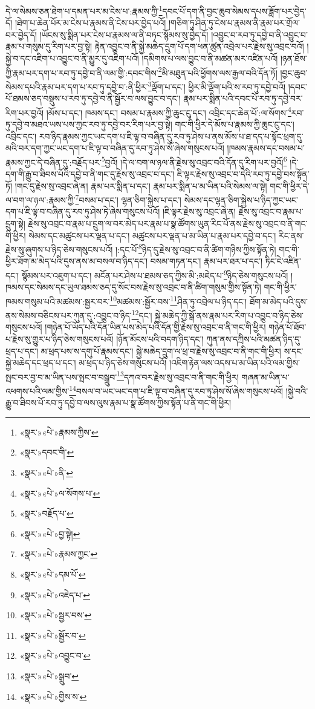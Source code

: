 དེ་ལ་སེམས་ཅན་ཐེག་པ་དམན་པར་མ་ངེས་པ་:རྣམས་ཀྱི་\footnote{«སྣར་»«པེ་»རྣམས་ཀྱིས་}དབང་པོ་དག་ནི་བྱང་ཆུབ་སེམས་དཔས་ཟློག་པར་བྱེད་དོ། །ཐེག་པ་ཆེན་པོར་མ་ངེས་པ་རྣམས་ནི་ངེས་པར་བྱེད་པའོ། །གཅིག་ཏུ་ཤིན་ཏུ་ངེས་པ་རྣམས་ནི་རྣམ་པར་གྲོལ་བར་བྱེད་དོ། །ཡོངས་སུ་སྨིན་པར་ངེས་པ་རྣམས་ལ་ནི་བཏང་སྙོམས་སུ་བྱེད་དོ། །འབྱུང་བ་རབ་ཏུ་དབྱེ་བ་ནི་འབྱུང་བ་རྣམ་པ་གསུམ་དུ་རིག་པར་བྱ་སྟེ། རྟེན་འབྱུང་བ་ནི་སྐྱེ་མཆེད་དྲུག་པོ་དག་ཕན་ཚུན་འབྲེལ་པར་རྗེས་སུ་འབྲང་བའོ། །སྐྱེ་བ་དང་འཇིག་པ་འབྱུང་བ་ནི་མྱུར་དུ་འཇིག་པའོ། །དམིགས་པ་ལས་བྱུང་བ་ནི་མཚན་མར་འཛིན་པའོ། །ཉན་ཐོས་ཀྱི་རྣམ་པར་དག་པ་རབ་ཏུ་དབྱེ་བ་ནི་ལམ་གྱི་:དབང་གིས་\footnote{«སྣར་»དབང་གི་}མི་མཐུན་པའི་ཕྱོགས་ལས་རྒྱལ་བའི་དོན་ཏོ། །བྱང་ཆུབ་སེམས་དཔའི་རྣམ་པར་དག་པ་རབ་ཏུ་དབྱེ་བ་:ནི་ཕྱིར་\footnote{«སྣར་»«པེ་»ནི་}ལྡོག་པ་དང་། ཕྱིར་མི་ལྡོག་པའི་ས་རབ་ཏུ་དབྱེ་བའོ། །དབང་པོ་ཐམས་ཅད་བསྡུས་པ་རབ་ཏུ་དབྱེ་བ་ནི་སྦྱོར་བ་ལས་བྱུང་བ་དང་། རྣམ་པར་སྨིན་པའི་དབང་པོ་རབ་ཏུ་དབྱེ་བར་རིག་པར་བྱའོ། །མོས་པ་དང་། ཁམས་དང་། བསམ་པ་རྣམས་ཀྱི་ཆུང་ངུ་དང་། འབྲིང་དང་ཆེན་པོ་:ལ་སོགས་\footnote{«སྣར་»«པེ་»ལ་སོགས་པ་}རབ་ཏུ་དབྱེ་བ་མཐའ་ཡས་པས་ཀྱང་རབ་ཏུ་དབྱེ་བར་རིག་པར་བྱ་སྟེ། གང་གི་ཕྱིར་དེ་མོས་པ་རྣམས་ཀྱི་ཆུང་ངུ་དང་། འབྲིང་དང་། རབ་ཉིད་རྣམས་ཀྱང་ཡང་དག་པ་ཇི་ལྟ་བ་བཞིན་དུ་རབ་ཏུ་ཤེས་པ་ནས་མོས་པ་ཐ་དད་པ་སྟོང་ཕྲག་དུ་མའི་བར་དག་ཀྱང་ཡང་དག་པ་ཇི་ལྟ་བ་བཞིན་དུ་རབ་ཏུ་ཤེས་སོ་ཞེས་གསུངས་པའོ། །ཁམས་རྣམས་དང་བསམ་པ་རྣམས་ཀྱང་དེ་བཞིན་དུ་:བརྗོད་པར་\footnote{«སྣར་»བརྗོད་པ་}བྱའོ། །དེ་ལ་བག་ལ་ཉལ་ནི་རྗེས་སུ་འབྲང་བའི་དོན་དུ་རིག་པར་བྱའོ།\footnote{«སྣར་»«པེ་»བྱ་སྟེ།} །དེ་དག་གི་རྒྱུ་བ་ཐིབས་པོའི་དབྱེ་བ་ནི་གང་དུ་རྗེས་སུ་འབྲང་བ་དང་། ཇི་ལྟར་རྗེས་སུ་འབྲང་བ་དེའི་རབ་ཏུ་དབྱེ་བས་སྟོན་ཏོ། །གང་དུ་རྗེས་སུ་འབྲང་ཞེ་ན། རྣམ་པར་སྨིན་པ་དང་། རྣམ་པར་སྨིན་པ་མ་ཡིན་པའི་སེམས་ལ་སྟེ། གང་གི་ཕྱིར་དེ་ལ་བག་ལ་ཉལ་:རྣམས་ཀྱི་\footnote{«སྣར་»«པེ་»རྣམས་ཀྱང་}བསམ་པ་དང་། ལྷན་ཅིག་སྐྱེས་པ་དང་། སེམས་དང་ལྷན་ཅིག་སྐྱེས་པ་ཉིད་ཀྱང་ཡང་དག་པ་ཇི་ལྟ་བ་བཞིན་དུ་རབ་ཏུ་ཤེས་ཏེ་ཞེས་གསུངས་པའོ། །ཇི་ལྟར་རྗེས་སུ་འབྲང་ཞེ་ན། རྗེས་སུ་འབྲང་བ་རྣམ་པ་དྲུག་སྟེ། རྗེས་སུ་འབྲང་བ་རྣམ་པ་དྲུག་ལ་བར་མེད་པར་རྣམ་པ་སྣ་ཚོགས་ཡུན་རིང་པོ་ནས་རྗེས་སུ་འབྲང་བ་ནི་གང་གི་ཕྱིར། སེམས་དང་མཚུངས་པར་ལྡན་པ་དང་། མཚུངས་པར་ལྡན་པ་མ་ཡིན་པ་རྣམ་པར་དབྱེ་བ་དང་། རིང་ནས་རྗེས་སུ་ཞུགས་པ་ཉིད་ཅེས་གསུངས་པའོ། །:དང་པོ་\footnote{«སྣར་»«པེ་»དམ་པོ་}ཉིད་དུ་རྗེས་སུ་འབྲང་བ་ནི་ཚིག་གཉིས་ཀྱིས་སྟོན་ཏེ། གང་གི་ཕྱིར་ཐོག་མ་མེད་པའི་དུས་ནས་མ་བསལ་བ་ཉིད་དང་། བསམ་གཏན་དང་། རྣམ་པར་ཐར་པ་དང་། ཏིང་ངེ་འཛིན་དང་། སྙོམས་པར་འཇུག་པ་དང་། མངོན་པར་ཤེས་པ་ཐམས་ཅད་ཀྱིས་མི་:མཇེད་པ་\footnote{«སྣར་»«པེ་»འཇེད་པ་}ཉིད་ཅེས་གསུངས་པའོ། །ཁམས་དང་སེམས་དང་ཡུལ་ཐམས་ཅད་དུ་སོང་བས་རྗེས་སུ་འབྲང་བ་ནི་ཚིག་གསུམ་གྱིས་སྟོན་ཏེ། གང་གི་ཕྱིར་ཁམས་གསུམ་པའི་མཚམས་:སྦྱར་བར་\footnote{«སྣར་»«པེ་»སྦྱར་བས་}མཚམས་:སྦྱོར་བས་\footnote{«སྣར་»«པེ་»སྦྱོར་བ་}ཤིན་ཏུ་འབྲེལ་པ་ཉིད་དང་། ཐོག་མ་མེད་པའི་དུས་ནས་སེམས་བཅིངས་པར་ཀུན་དུ་:འབྱུང་བ་ཉིད་\footnote{«སྣར་»«པེ་»འབྱུང་བ་}དང་། སྐྱེ་མཆེད་ཀྱི་སྒོ་ནས་རྣམ་པར་རིག་པ་འབྱུང་བ་ཉིད་ཅེས་གསུངས་པའོ། །གཉེན་པོ་ཡོད་པའི་དོན་ཡིན་པས་མེད་པའི་དོན་གྱི་རྗེས་སུ་འབྲང་བ་ནི་གང་གི་ཕྱིར། གཉེན་པོ་ཐོབ་པ་རྗེས་སུ་གྱུར་པ་ཉིད་ཅེས་གསུངས་པའོ། །ཉོན་མོངས་པའི་བདག་ཉིད་དང་། ཀུན་ནས་དཀྲིས་པའི་མཚན་ཉིད་དུ་ཕྲད་པ་དང་། མ་ཕྲད་པས་ས་དགུ་པོ་རྣམས་དང་། སྐྱེ་མཆེད་དྲུག་ལ་ཕྲ་བ་རྗེས་སུ་འབྲང་བ་ནི་གང་གི་ཕྱིར། ས་དང་སྐྱེ་མཆེད་དང་ཕྲད་པ་དང་། མ་ཕྲད་པ་ཉིད་ཅེས་གསུངས་པའོ། །འཇིག་རྟེན་ལས་འདས་པ་མ་ཡིན་པའི་ལམ་གྱིས་སྤང་བར་བྱ་བ་མ་ཡིན་པས་སྤང་བ་བསྒྲུབ་\footnote{«སྣར་»«པེ་»སྒྲུབ་}དཀའ་བར་རྗེས་སུ་འབྲང་བ་ནི་གང་གི་ཕྱིར། གཞན་མ་ཡིན་པ་འཕགས་པའི་ལམ་གྱིས་\footnote{«སྣར་»«པེ་»གྱིས་ས་}བསལ་བ་ཡང་ཡང་དག་པ་ཇི་ལྟ་བ་བཞིན་དུ་རབ་ཏུ་ཤེས་སོ་ཞེས་གསུངས་པའོ། །སྐྱེ་བའི་རྒྱུ་བ་ཐིབས་པོ་རབ་ཏུ་དབྱེ་བ་ལས་ལུས་རྣམ་པ་སྣ་ཚོགས་ཀྱིས་སྟོན་པ་ནི་གང་གི་ཕྱིར། 